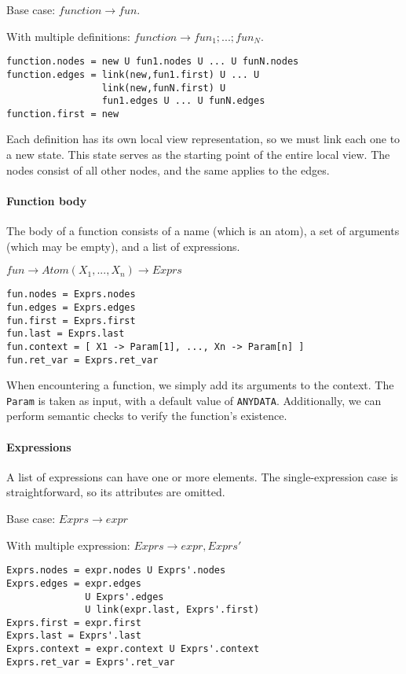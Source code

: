 \bigskip

\noindent Base case: $function \to fun.$

\noindent With multiple definitions: $function \to fun_1;...;fun_N.$

\begin{verbatim}
function.nodes = new U fun1.nodes U ... U funN.nodes
function.edges = link(new,fun1.first) U ... U 
                 link(new,funN.first) U 
                 fun1.edges U ... U funN.edges
function.first = new
\end{verbatim}

Each definition has its own local view representation, so we must link  
each one to a new state. This state serves as the starting point of  
the entire local view. The nodes consist of all other nodes, and  
the same applies to the edges.  

\paragraph{Function body}  
The body of a function consists of a name (which is an atom),  
a set of arguments (which may be empty), and a list of expressions.  

\bigskip

\noindent $fun \to Atom(X_1,...,X_n) \to Exprs$

\begin{verbatim}
fun.nodes = Exprs.nodes
fun.edges = Exprs.edges
fun.first = Exprs.first
fun.last = Exprs.last
fun.context = [ X1 -> Param[1], ..., Xn -> Param[n] ]
fun.ret_var = Exprs.ret_var
\end{verbatim}

When encountering a function, we simply add its arguments to the context.  
The \texttt{Param} is taken as input, with a default value of \texttt{ANYDATA}.  
Additionally, we can perform semantic checks to verify the function’s  
existence.  

\paragraph{Expressions}  
A list of expressions can have one or more elements. The single-expression  
case is straightforward, so its attributes are omitted.  

\bigskip

\noindent Base case: $Exprs \to expr$

\noindent With multiple expression: $Exprs \to expr,Exprs'$

\begin{verbatim}
Exprs.nodes = expr.nodes U Exprs'.nodes
Exprs.edges = expr.edges 
              U Exprs'.edges 
              U link(expr.last, Exprs'.first)
Exprs.first = expr.first
Exprs.last = Exprs'.last
Exprs.context = expr.context U Exprs'.context
Exprs.ret_var = Exprs'.ret_var
\end{verbatim}

